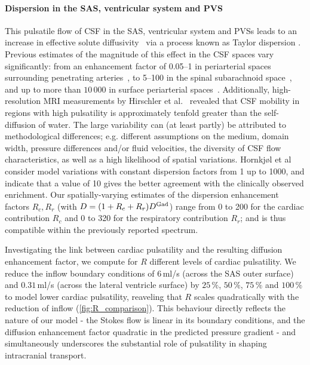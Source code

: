 \documentclass[fleqn,10pt]{wlscirep}
\begin{document}
\paragraph{Dispersion in the SAS, ventricular system and PVS}
This pulsatile flow of CSF in the SAS, ventricular system and PVSs
leads to an increase in effective solute
diffusivity~\cite{stockman2007effect, hettiarachchi2011effect,
  asgari2016glymphatic, sharp2019dispersion, ray2021quantitative} via
a process known as Taylor dispersion \cite{taylor1953dispersion,
  watson1983diffusion}. Previous estimates of the magnitude of this
effect in the CSF spaces vary significantly: from an enhancement
factor of 0.05--1 in periarterial spaces surrounding penetrating
arteries~\cite{asgari2016glymphatic, troyetsky2021dispersion}, to
5--100 in the spinal subarachnoid space~\cite{stockman2007effect,
  hettiarachchi2011effect, sharp2019dispersion}, and up to more than
$10\,000$ in surface periarterial spaces~\cite{ray2021quantitative,
  sharp2019dispersion}.
Additionally, high-resolution MRI measurements by Hirschler et al.~\cite{hirschler2024region} revealed that CSF mobility in regions with high pulsatility is approximately tenfold greater than the self-diffusion of water.
The large variability can (at least partly) be
attributed to methodological differences; e.g. different assumptions
on the medium, domain width, pressure differences and/or fluid
velocities, the diversity of CSF flow characteristics, as well as a
high likelihood of spatial variations. Hornkjøl et
al~\cite{hornkjol2022csf} consider model variations with constant
dispersion factors from 1 up to 1000, and indicate that a value of 10
gives the better agreement with the clinically observed
enrichment. Our spatially-varying estimates of the dispersion
enhancement factors $R_c, R_r$ (with $D = (1 + R_c + R_r) D^{\rm
  Gad}$) range from 0 to 200 for the cardiac contribution $R_c$ and 0
to 320 for the respiratory contribution $R_r$; and is thus compatible
within the previously reported spectrum. 

Investigating the link between cardiac pulsatility and the resulting diffusion enhancement factor, we compute for $R$ different levels of cardiac pulsatility. We reduce the inflow boundary conditions of $6\,$ml/s (across the SAS outer surface) and $0.31\,$ml/s (across the lateral ventricle surface) by $25\,\%$, $50\,\%$, $75\,\%$ and $100\,\%$ to model lower cardiac pulsatility, reaveling that $R$ scales quadratically with the reduction of inflow (\cref{fig:R_comparison}). This behaviour directly reflects the nature of our model - the Stokes flow is linear in its boundary conditions, and the diffusion enhancement factor quadratic in the predicted pressure gradient - and simultaneously underscores the substantial role of pulsatility in shaping intracranial transport. 
\end{document}
